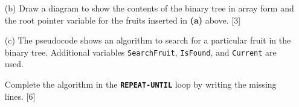 \begin{enumerate}
\item[(b)]  Draw a diagram to show the contents of the binary tree in array
form and the root pointer variable for the fruits inserted in \textbf{(a)}
above. \hfill{}{[}3{]}
\item[(c)]  The pseudocode shows an algorithm to search for a particular fruit
in the binary tree. Additional variables \texttt{SearchFruit}, \texttt{IsFound},
and \texttt{Current} are used. 

\noindent{}

Complete the algorithm in the \texttt{\textbf{REPEAT-UNTIL}} loop
by writing the missing lines. \hfill{}{[}6{]}
\end{enumerate}